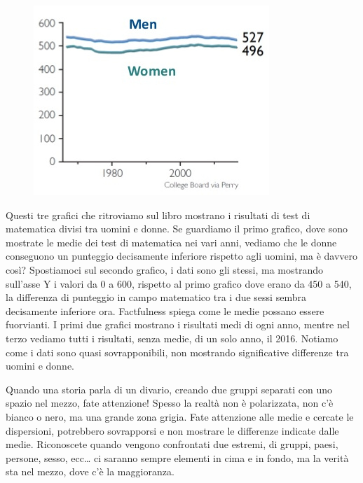 \documentclass[12pt]{book} %
\begin{document}
\begin{figure}[H]
\begin{minipage}{0.3\textwidth}
        \includegraphics[width=\linewidth]{images/Libro-img005.jpg}
    \end{minipage}
\end{figure}

Questi tre grafici che ritroviamo sul libro mostrano i risultati di test di matematica divisi tra uomini e donne. Se
guardiamo il primo grafico, dove sono mostrate le medie dei test di matematica nei vari anni, vediamo che le donne
conseguono un punteggio decisamente inferiore rispetto agli uomini, ma è davvero così? Spostiamoci sul secondo grafico,
i dati sono gli stessi, ma mostrando sull'asse Y i valori da 0 a 600, rispetto al primo grafico
dove erano da 450 a 540, la differenza di punteggio in campo matematico tra i due sessi sembra decisamente inferiore
ora. Factfulness spiega come le medie possano essere fuorvianti. I primi due grafici mostrano i risultati medi di ogni
anno, mentre nel terzo vediamo tutti i risultati, senza medie, di un solo anno, il 2016. Notiamo come i dati sono quasi
sovrapponibili, non mostrando significative differenze tra uomini e donne.

Quando una storia parla di un divario, creando due gruppi separati con uno spazio nel mezzo, fate attenzione! Spesso la
realtà non è polarizzata, non c'è bianco o nero, ma una grande zona grigia. Fate attenzione alle
medie e cercate le dispersioni, potrebbero sovrapporsi e non mostrare le differenze indicate dalle medie. Riconoscete
quando vengono confrontati due estremi, di gruppi, paesi, persone, sesso, ecc… ci saranno sempre elementi in cima e in
fondo, ma la verità sta nel mezzo, dove c'è la maggioranza.
\end{document}
